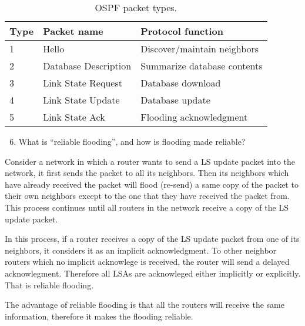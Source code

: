 \begin{table}[H]
    \label{tab:q1.e}
    \caption{OSPF packet types. \cite{moy1998rfc2328} }
    \begin{center}
    \begin{tabular}{|l|l|l|}
        \hline
        Type    & Packet name           & Protocol function             \\ \hline
        1       & Hello                 & Discover/maintain neighbors   \\ \hline
        2       & Database Description  & Summarize database contents   \\ \hline
        3       & Link State Request    & Database download             \\ \hline
        4       & Link State Update     & Database update               \\ \hline
        5       & Link State Ack        & Flooding acknowledgment       \\ \hline
    \end{tabular}
    \end{center}
\end{table}

\begin{enumerate}
    \setcounter{enumi}{5}
    \item
    What is “reliable flooding”, and how is flooding made reliable?

\end{enumerate}

\begin{tcolorbox}
    \mysolution{} 
    Consider a network in which a router wants to send a LS update packet into the network, 
    it first sends the packet to all its neighbors. Then its neighbors which have
    already received the packet will flood (re-send) a same copy of the packet to their 
    own neighbors except to the one that they have received the packet from. 
    This process continues until all routers in the network receive a copy of the LS update
    packet. 

    In this process, if a router receives a copy of the LS update packet from one of its neighbors, it 
    considers it as an implicit acknowledgment. To other neighbor routers which no implicit
    acknowlege is received, the router will send a delayed acknowlegment. Therefore all 
    LSAs are acknowleged either implicitly or explicitly. That is reliable flooding. 

    The advantage of reliable flooding is that all the routers will receive the same information,
    therefore it makes the flooding reliable. 
\end{tcolorbox}

